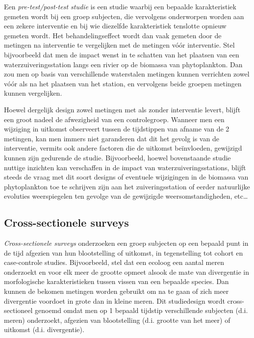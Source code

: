 \documentclass[
  12pt,dutch,coursenotes]{book}
\theoremstyle{definition}
\theoremstyle{definition}
\theoremstyle{definition}
\theoremstyle{definition}
\theoremstyle{remark}
\begin{document}
Een \emph{pre-test/post-test studie} is een studie waarbij een bepaalde
karakteristiek gemeten wordt bij een groep subjecten, die vervolgens
onderworpen worden aan een zekere interventie en bij wie diezelfde
karakteristiek tenslotte opnieuw gemeten wordt. Het behandelingseffect wordt
dan vaak gemeten door de metingen na interventie te vergelijken met de
metingen vóór interventie.
Stel bijvoorbeeld dat men de impact wenst in te schatten van het plaatsen van een waterzuiveringsstation langs een rivier op de biomassa van phytoplankton. Dan zou men op basis van verschillende waterstalen metingen kunnen verrichten zowel vóór als na het plaatsen van het station, en vervolgens beide groepen metingen kunnen vergelijken.

Hoewel dergelijk design zowel metingen met als zonder interventie levert,
blijft een groot nadeel de afwezigheid van een controlegroep. Wanneer men
een wijziging in uitkomst observeert tussen de tijdstippen van afname van de
2 metingen, kan men immers niet garanderen dat dit het gevolg is van de
interventie, vermits ook andere factoren die de uitkomst beïnvloeden,
gewijzigd kunnen zijn gedurende de studie. Bijvoorbeeld, hoewel bovenstaande studie nuttige inzichten kan verschaffen in de impact van waterzuiveringsstations, blijft steeds de vraag met dit soort designs of eventuele wijzigingen in de biomassa van phytoplankton toe te schrijven zijn aan het zuiveringsstation of eerder natuurlijke evoluties weerspiegelen ten gevolge van de gewijzigde weersomstandigheden, etc\ldots{}

\hypertarget{cross-sectionele-surveys}{%
\subsection{Cross-sectionele surveys}\label{cross-sectionele-surveys}}

\emph{Cross-sectionele surveys} onderzoeken een groep subjecten op een
bepaald punt in de tijd afgezien van hun blootstelling of uitkomst, in
tegenstelling tot cohort en case-controle studies. Bijvoorbeeld, stel dat een ecoloog een aantal meren onderzoekt en voor elk meer de grootte opmeet alsook de mate van divergentie in morfologische karakteristieken tussen vissen van een bepaalde species.
Dan kunnen de bekomen metingen worden gebruikt om na te gaan of zich meer divergentie voordoet in grote dan in kleine meren. Dit studiedesign wordt cross-sectioneel genoemd omdat men op 1 bepaald tijdstip verschillende subjecten (d.i. meren) onderzoekt, afgezien van blootstelling (d.i. grootte van het meer) of uitkomst (d.i. divergentie).
\end{document}
